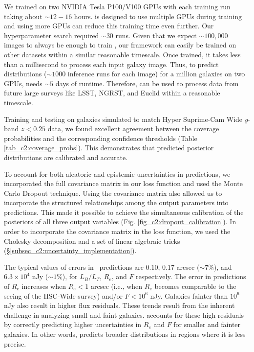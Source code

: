 We trained \gampen{} on two  NVIDIA Tesla P100/V100 GPUs with each training run taking about $\sim 12 - 16$ hours. \gampen{} is designed to use multiple GPUs during training and using more GPUs can reduce this training time even further. Our hyperparameter search required $\sim 30$ runs. Given that we expect $\sim 100,000$ images to always be enough to train \gampen{}, our framework can easily be trained on other datasets within a similar reasonable timescale. Once trained, it takes \gampen{} less than a millisecond to process each input galaxy image. Thus, to predict distributions ($\sim 1000$ inference runs for each image) for a million galaxies on two GPUs, \gampen{} needs $\sim 5$ days of runtime. Therefore, \gampen{} can be used to process data from future large surveys like LSST, NGRST, and Euclid within a reasonable timescale.

Training and testing \gampen{} on galaxies simulated to match Hyper Suprime-Cam Wide \textit{g}-band $z<0.25$ data, we found excellent agreement between the coverage probabilities and the corresponding confidence thresholds (Table \ref{tab_c2:coverage_probs}). 
This demonstrates that \gampen{} predicted posterior distributions are calibrated and accurate.

To account for both aleatoric and epistemic uncertainties in \gampen{} predictions, we incorporated the full covariance matrix in our loss function and used the Monte Carlo Dropout technique. Using the covariance matrix also allowed us to incorporate the structured relationships among the output parameters into \gampen{} predictions. This made it possible to achieve the simultaneous calibration of the posteriors of all three output variables (Fig. \ref{fig_c2:dropout_calibration}). In order to incorporate the covariance matrix in the loss function, we used the Cholesky decomposition and a set of linear algebraic tricks (\S \ref{subsec_c2:uncertainty_implementation}).

The typical values of errors in \gampen\ predictions are $0.10$, $0.17$ arcsec {($\sim 7\%$)}, and $6.3\times10^4$ nJy ($\sim 1\%$), for $L_B/L_T$, $R_e$, and $F$ respectively. The error in \gampen{} predictions of $R_e$ increases when $R_e < 1$ arcsec (i.e., when $R_e$ becomes comparable to the seeing of the HSC-Wide survey) and/or $F < 10^6$ nJy. Galaxies fainter than $10^6$ nJy also result in higher flux residuals. These trends result from the inherent challenge in analyzing small and faint galaxies. \gampen{} accounts for these high residuals by correctly predicting higher uncertainties in $R_e$ and $F$ for smaller and fainter galaxies. In other words, \gampen{} predicts broader distributions in regions where it is less precise.

